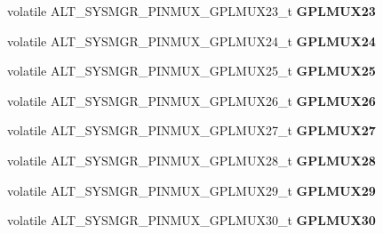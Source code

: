\begin{DoxyCompactItemize}
volatile A\+L\+T\+\_\+\+S\+Y\+S\+M\+G\+R\+\_\+\+P\+I\+N\+M\+U\+X\+\_\+\+G\+P\+L\+M\+U\+X23\+\_\+t {\bfseries G\+P\+L\+M\+U\+X23}
\item 
\mbox{\label{structALT__SYSMGR__PINMUX__s_a7ffb918c7f81c7d348f2fbbef78bba01}} 
volatile A\+L\+T\+\_\+\+S\+Y\+S\+M\+G\+R\+\_\+\+P\+I\+N\+M\+U\+X\+\_\+\+G\+P\+L\+M\+U\+X24\+\_\+t {\bfseries G\+P\+L\+M\+U\+X24}
\item 
\mbox{\label{structALT__SYSMGR__PINMUX__s_a72148372ffe0e67204a6205cf61af70f}} 
volatile A\+L\+T\+\_\+\+S\+Y\+S\+M\+G\+R\+\_\+\+P\+I\+N\+M\+U\+X\+\_\+\+G\+P\+L\+M\+U\+X25\+\_\+t {\bfseries G\+P\+L\+M\+U\+X25}
\item 
\mbox{\label{structALT__SYSMGR__PINMUX__s_a8d012cfd08792f3cf2702fc8c26fee1f}} 
volatile A\+L\+T\+\_\+\+S\+Y\+S\+M\+G\+R\+\_\+\+P\+I\+N\+M\+U\+X\+\_\+\+G\+P\+L\+M\+U\+X26\+\_\+t {\bfseries G\+P\+L\+M\+U\+X26}
\item 
\mbox{\label{structALT__SYSMGR__PINMUX__s_a872ef0ccbff43f6ff215eebc749a7ea8}} 
volatile A\+L\+T\+\_\+\+S\+Y\+S\+M\+G\+R\+\_\+\+P\+I\+N\+M\+U\+X\+\_\+\+G\+P\+L\+M\+U\+X27\+\_\+t {\bfseries G\+P\+L\+M\+U\+X27}
\item 
\mbox{\label{structALT__SYSMGR__PINMUX__s_afc04788be36c180498a9c06a382c71ea}} 
volatile A\+L\+T\+\_\+\+S\+Y\+S\+M\+G\+R\+\_\+\+P\+I\+N\+M\+U\+X\+\_\+\+G\+P\+L\+M\+U\+X28\+\_\+t {\bfseries G\+P\+L\+M\+U\+X28}
\item 
\mbox{\label{structALT__SYSMGR__PINMUX__s_a0451188aefd89c67157bd373ef7d07ad}} 
volatile A\+L\+T\+\_\+\+S\+Y\+S\+M\+G\+R\+\_\+\+P\+I\+N\+M\+U\+X\+\_\+\+G\+P\+L\+M\+U\+X29\+\_\+t {\bfseries G\+P\+L\+M\+U\+X29}
\item 
\mbox{\label{structALT__SYSMGR__PINMUX__s_af3f3b56082e33645fb038983abaa21b6}} 
volatile A\+L\+T\+\_\+\+S\+Y\+S\+M\+G\+R\+\_\+\+P\+I\+N\+M\+U\+X\+\_\+\+G\+P\+L\+M\+U\+X30\+\_\+t {\bfseries G\+P\+L\+M\+U\+X30}
\item 
\mbox{\label{structALT__SYSMGR__PINMUX__s_ae2e63102050f9f19090e5bfc5b08990c}} 

\end{DoxyCompactItemize}
